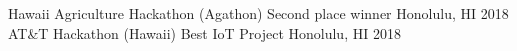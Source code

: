 \begin{cvhonors}
	\cvhonor
		{Hawaii Agriculture Hackathon (Agathon)}
	    {Second place winner}
	    {Honolulu, HI}
	    {2018}  
	\cvhonor
		{AT\&T Hackathon (Hawaii)}
	    {Best IoT Project}
	    {Honolulu, HI}
	    {2018}
\end{cvhonors}

